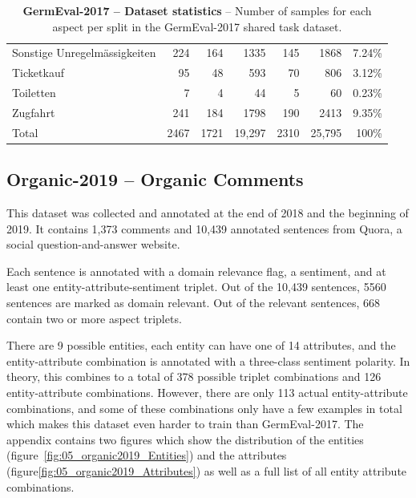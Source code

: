 \begin{table}
\begin{tabular}{lrrrrrr}
        Sonstige Unregelmässigkeiten & 224    & 164    & 1335   & 145  & 1868   & 7.24\%  \\
        Ticketkauf                   & 95     & 48     & 593    & 70   & 806    & 3.12\%  \\
        Toiletten                    & 7      & 4      & 44     & 5    & 60     & 0.23\%  \\
        Zugfahrt                     & 241    & 184    & 1798   & 190  & 2413   & 9.35\%  \\ 
        \midrule
        Total                        & 2467   & 1721   & 19,297 & 2310 & 25,795 & 100\%   \\ 
        \bottomrule
    \end{tabular}
    \caption{\textbf{GermEval-2017 -- Dataset statistics} -- Number of samples for each aspect per split in the GermEval-2017 shared task dataset.}
\label{tab:05_germevalDatasetStats}
\end{table}

\subsection{Organic-2019 -- Organic Comments}
\label{sec:05_organic2019}
This dataset was collected and annotated at the end of 2018 and the beginning of 2019. It contains 1,373 comments and 10,439 annotated sentences from Quora, a social question-and-answer website.
\medskip

Each sentence is annotated with a domain relevance flag, a sentiment, and at least one entity-attribute-sentiment triplet. Out of the 10,439 sentences, 5560 sentences are marked as domain relevant. Out of the relevant sentences, 668 contain two or more aspect triplets.
\medskip

There are 9 possible entities, each entity can have one of 14 attributes, and the entity-attribute combination is annotated with a three-class sentiment polarity. In theory, this combines to a total of 378 possible triplet combinations and 126 entity-attribute combinations. However, there are only 113 actual entity-attribute combinations, and some of these combinations only have a few examples in total which makes this dataset even harder to train than GermEval-2017. The appendix contains two figures which show the distribution of the entities {(figure~\ref{fig:05_organic2019_Entities})} and the attributes {(figure\ref{fig:05_organic2019_Attributes})} as well as a full list of all entity attribute combinations.
\medskip

